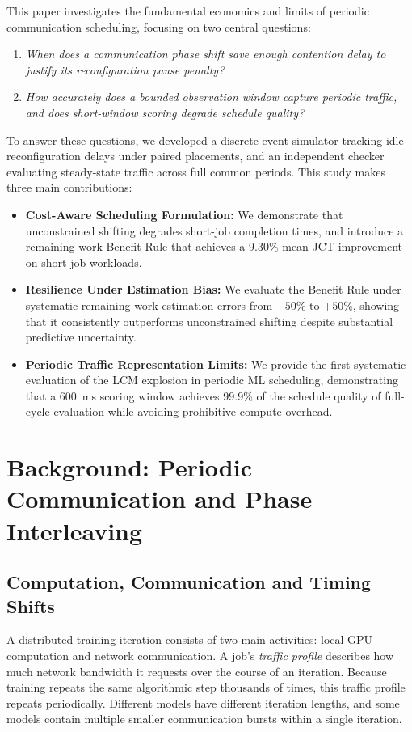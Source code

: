 \documentclass[conference]{IEEEtran}
\begin{document}
This paper investigates the fundamental economics and limits of periodic communication scheduling, focusing on two central questions:
\begin{enumerate}
    \item \emph{When does a communication phase shift save enough contention delay to justify its reconfiguration pause penalty?}
    \item \emph{How accurately does a bounded observation window capture periodic traffic, and does short-window scoring degrade schedule quality?}
\end{enumerate}

To answer these questions, we developed a discrete-event simulator tracking idle reconfiguration delays under paired placements, and an independent checker evaluating steady-state traffic across full common periods. This study makes three main contributions:
\begin{itemize}
    \item \textbf{Cost-Aware Scheduling Formulation:} We demonstrate that unconstrained shifting degrades short-job completion times, and introduce a remaining-work Benefit Rule that achieves a 9.30\% mean JCT improvement on short-job workloads.
    \item \textbf{Resilience Under Estimation Bias:} We evaluate the Benefit Rule under systematic remaining-work estimation errors from $-50\%$ to $+50\%$, showing that it consistently outperforms unconstrained shifting despite substantial predictive uncertainty.
    \item \textbf{Periodic Traffic Representation Limits:} We provide the first systematic evaluation of the LCM explosion in periodic ML scheduling, demonstrating that a 600~ms scoring window achieves 99.9\% of the schedule quality of full-cycle evaluation while avoiding prohibitive compute overhead.
\end{itemize}

\section{Background: Periodic Communication and Phase Interleaving}
\label{sec:periodic-coordination}

\subsection{Computation, Communication and Timing Shifts}

A distributed training iteration consists of two main activities: local GPU computation
and network communication. A job's \emph{traffic profile} describes how much network
bandwidth it requests over the course of an iteration. Because training repeats the
same algorithmic step thousands of times, this traffic profile repeats periodically.
Different models have different iteration lengths, and some models contain multiple
smaller communication bursts within a single iteration.
\end{document}
